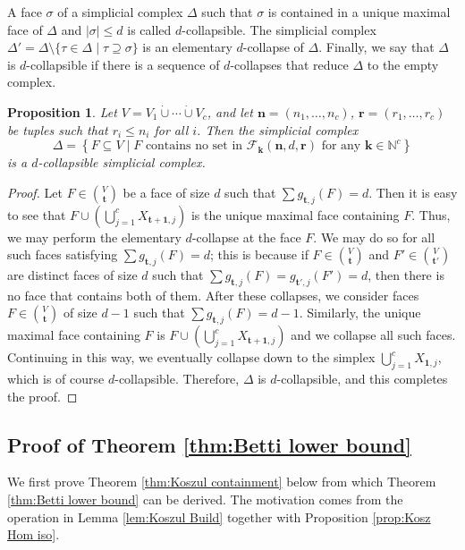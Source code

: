 \documentclass[a4paper, 10pt, reqno, english, ones]{amsart}  %
\newtheorem{proposition}[theorem]{Proposition}
\theoremstyle{definition}
\theoremstyle{remark}
\begin{document}
A face $\sigma$ of a simplicial complex $\Delta$ such that  $\sigma$ is contained in a unique maximal face of $\Delta$ and $|\sigma| \leq d$ is called $d$-collapsible. The simplicial complex $\Delta' = \Delta \setminus \{\tau\in \Delta \mid \tau \supseteq \sigma \}$ is an elementary $d$-collapse of $\Delta$. Finally, we say that $\Delta$ is $d$-collapsible if there is a sequence of $d$-collapses that reduce $\Delta$ to the empty complex.

\begin{proposition}\label{prop:Upper Bound Tight}
    Let $V=V_1\dot{\cup} \cdots \dot{\cup} V_c$, and let $\mathbf{n}=(n_1,\dots,n_c)$, $\mathbf{r}=(r_1,\dots,r_c)$ be tuples such that $r_i\leq n_i$ for all $i$. Then the simplicial complex
    \[
    \Delta = \left\{F\subseteq V \mid F \textrm{ contains no set in } \mathscr{F}_{\mathbf{k}}(\mathbf{n},d,\mathbf{r}) \textrm{ for any }\mathbf{k}\in \mathbb{N}^c  \right\}
    \]
    is a $d$-collapsible simplicial complex.
\end{proposition}
\begin{proof}
    Let $F\in {V \choose \mathbf{t}}$ be a face of size $d$ such that $\sum g_{\mathbf{t},j}(F) = d$. Then it is easy to see that $F \cup (\bigcup_{j=1}^c X_{\mathbf{t}+\mathbf{1},j})$ is the unique maximal face containing $F$.  Thus, we may perform the elementary $d$-collapse at the face $F$. We may do so for all such faces satisfying $\sum g_{\mathbf{t},j}(F) = d$; this is because if $F\in {V \choose \mathbf{t}}$ and $F'\in {V \choose \mathbf{t}'}$ are distinct faces of size $d$ such that $\sum g_{\mathbf{t},j}(F) = g_{\mathbf{t}',j}(F') = d$, then there is no face that contains both of them. After these collapses, we consider faces $F\in {V \choose \mathbf{t}}$ of size $d-1$ such that $\sum g_{\mathbf{t},j}(F) = d-1$. Similarly, the unique maximal face containing $F$ is $F \cup (\bigcup_{j=1}^c X_{\mathbf{t}+\mathbf{1},j})$ and we collapse all such faces. Continuing in this way, we eventually collapse down to the simplex $\bigcup_{j=1}^c X_{\mathbf{1},j}$, which is of course $d$-collapsible. Therefore, $\Delta$ is $d$-collapsible, and this completes the proof.
\end{proof}

\subsection{Proof of Theorem \ref{thm:Betti lower bound}}\label{sec:ME-betti}

We first prove Theorem \ref{thm:Koszul containment} below from which Theorem \ref{thm:Betti lower bound} can be derived. The motivation comes from the operation in Lemma \ref{lem:Koszul Build} together with Proposition \ref{prop:Kosz Hom iso}.
\end{document}
